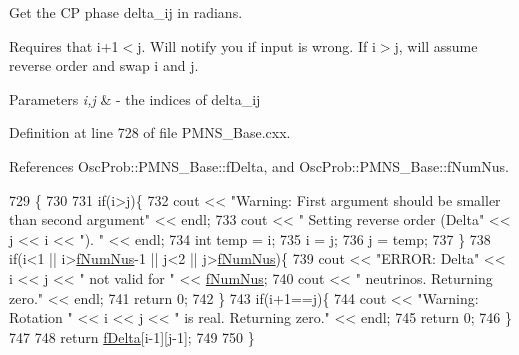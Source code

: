 Get the CP phase delta\+\_\+ij in radians.

Requires that i+1$<$j. Will notify you if input is wrong. If i$>$j, will assume reverse order and swap i and j.


\begin{DoxyParams}{Parameters}
{\em i,j} & -\/ the indices of delta\+\_\+ij \\
\hline
\end{DoxyParams}


Definition at line 728 of file P\+M\+N\+S\+\_\+\+Base.\+cxx.



References Osc\+Prob\+::\+P\+M\+N\+S\+\_\+\+Base\+::f\+Delta, and Osc\+Prob\+::\+P\+M\+N\+S\+\_\+\+Base\+::f\+Num\+Nus.


\begin{DoxyCode}
729 \{
730 
731   \textcolor{keywordflow}{if}(i>j)\{
732     cout << \textcolor{stringliteral}{"Warning: First argument should be smaller than second argument"} << endl;
733     cout << \textcolor{stringliteral}{"         Setting reverse order (Delta"} << j << i << \textcolor{stringliteral}{"). "} << endl;
734     \textcolor{keywordtype}{int} temp = i;
735     i = j;
736     j = temp;
737   \}
738   \textcolor{keywordflow}{if}(i<1 || i>\hyperlink{classOscProb_1_1PMNS__Base_a24bb74bed63569dfe88b18fa6a08060e}{fNumNus}-1 || j<2 || j>\hyperlink{classOscProb_1_1PMNS__Base_a24bb74bed63569dfe88b18fa6a08060e}{fNumNus})\{
739     cout << \textcolor{stringliteral}{"ERROR: Delta"} << i << j << \textcolor{stringliteral}{" not valid for "} << \hyperlink{classOscProb_1_1PMNS__Base_a24bb74bed63569dfe88b18fa6a08060e}{fNumNus};
740     cout << \textcolor{stringliteral}{" neutrinos. Returning zero."} << endl;
741     \textcolor{keywordflow}{return} 0;
742   \}
743   \textcolor{keywordflow}{if}(i+1==j)\{
744     cout << \textcolor{stringliteral}{"Warning: Rotation "} << i << j << \textcolor{stringliteral}{" is real. Returning zero."} << endl;
745     \textcolor{keywordflow}{return} 0;
746   \}
747 
748   \textcolor{keywordflow}{return} \hyperlink{classOscProb_1_1PMNS__Base_ab2a5fa40e689b221c8a7d2c17213810d}{fDelta}[i-1][j-1];
749 
750 \}
\end{DoxyCode}
\mbox{\label{classOscProb_1_1PMNS__Base_ad26815ac5f4805d1259817e4936e5f8f}} 
